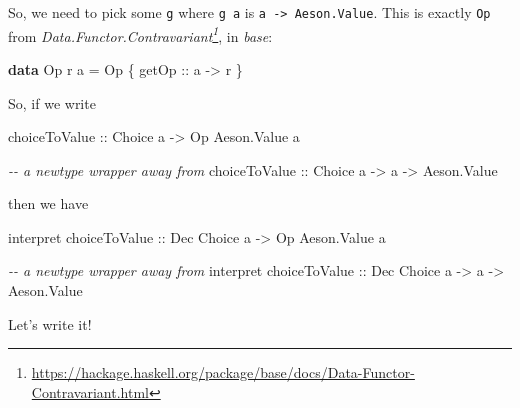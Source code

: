 \documentclass[]{article}
\newenvironment{Shaded}{}{}
\newcommand{\CommentTok}[1]{\textcolor[rgb]{0.38,0.63,0.69}{\textit{#1}}}
\newcommand{\DataTypeTok}[1]{\textcolor[rgb]{0.56,0.13,0.00}{#1}}
\newcommand{\KeywordTok}[1]{\textcolor[rgb]{0.00,0.44,0.13}{\textbf{#1}}}
\newcommand{\NormalTok}[1]{#1}
\newcommand{\OperatorTok}[1]{\textcolor[rgb]{0.40,0.40,0.40}{#1}}
\newcommand{\OtherTok}[1]{\textcolor[rgb]{0.00,0.44,0.13}{#1}}
\newcommand{\StringTok}[1]{\textcolor[rgb]{0.25,0.44,0.63}{#1}}
\renewcommand{\href}[2]{#2\footnote{\url{#1}}}
\begin{document}
So, we need to pick some \texttt{g} where \texttt{g\ a} is
\texttt{a\ -\textgreater{}\ Aeson.Value}. This is exactly \texttt{Op} from
\emph{\href{https://hackage.haskell.org/package/base/docs/Data-Functor-Contravariant.html}{Data.Functor.Contravariant}},
in \emph{base}:

\begin{Shaded}
\begin{Highlighting}[]
\KeywordTok{data} \DataTypeTok{Op}\NormalTok{ r a }\OtherTok{=} \DataTypeTok{Op}\NormalTok{ \{}\OtherTok{ getOp ::}\NormalTok{ a }\OtherTok{{-}\textgreater{}}\NormalTok{ r \}}
\end{Highlighting}
\end{Shaded}

So, if we write

\begin{Shaded}
\begin{Highlighting}[]
\OtherTok{choiceToValue ::} \DataTypeTok{Choice}\NormalTok{ a }\OtherTok{{-}\textgreater{}} \DataTypeTok{Op} \DataTypeTok{Aeson.Value}\NormalTok{ a}

\CommentTok{{-}{-} a newtype wrapper away from}
\OtherTok{choiceToValue ::} \DataTypeTok{Choice}\NormalTok{ a }\OtherTok{{-}\textgreater{}}\NormalTok{ a }\OtherTok{{-}\textgreater{}} \DataTypeTok{Aeson.Value}
\end{Highlighting}
\end{Shaded}

then we have

\begin{Shaded}
\begin{Highlighting}[]
\NormalTok{interpret}\OtherTok{ choiceToValue ::} \DataTypeTok{Dec} \DataTypeTok{Choice}\NormalTok{ a }\OtherTok{{-}\textgreater{}} \DataTypeTok{Op} \DataTypeTok{Aeson.Value}\NormalTok{ a}

\CommentTok{{-}{-} a newtype wrapper away from}
\NormalTok{interpret}\OtherTok{ choiceToValue ::} \DataTypeTok{Dec} \DataTypeTok{Choice}\NormalTok{ a }\OtherTok{{-}\textgreater{}}\NormalTok{ a }\OtherTok{{-}\textgreater{}} \DataTypeTok{Aeson.Value}
\end{Highlighting}
\end{Shaded}

Let's write it!

\begin{Shaded}
\end{Shaded}
\end{document}
